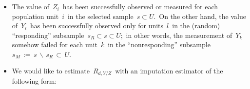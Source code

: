 \begin{itemize}
\begin{equation*}
        \!\!\right)
    \;\; = \;\;\,
        \underset{i \in U}{\sum}\,
        \underset{j \in U}{\sum}\;
        \dfrac{\pi_{ij} - \pi_{i}\pi_{j}}{\pi_{ij}}
        \cdot
        \dfrac{d_{i}\,\xi_{i}}{\pi_{i}}
        \cdot
        \dfrac{d_{j}\,\xi_{j}}{\pi_{j}}\,,
    \end{equation*}
    and the following Horvitz-Thompson variance estimator
    \begin{equation*}
    \widehat{V}^{\textnormal{(HT)}}(\,s\,;\xi_{\bullet}\,)
    \;\; := \;\;
        \underset{i \in s}{\sum}\,
        \underset{j \in s}{\sum}\;
        \dfrac{\pi_{ij} - \pi_{i}\pi_{j}}{\pi_{ij}}
        \cdot
        \dfrac{d_{i}\,\xi_{i}}{\pi_{i}}
        \cdot
        \dfrac{d_{j}\,\xi_{j}}{\pi_{j}}
    \end{equation*}
    is a design-unbiased estimator for the sampling variance of
    \,$\widehat{T}_{d,\xi_{\bullet}} \,=\, \widehat{T}_{d}(s\,;\xi_{\bullet})$,\,
    i.e.,
    \begin{equation*}
    E_{S}\!\left[\;
        \left.
        \widehat{V}^{\textnormal{(HT)}}(\,s\,;\xi_{\bullet}\,)
        \;\right\vert\!
        \begin{array}{c} \xi_{\bullet} \end{array}
        \!\right]
    \;\; = \;\;
        \Var_{S}\!\left(\,
            \left.
            \widehat{T}_{d}(s\,;\xi_{\bullet})
            \;\right\vert\!
            \begin{array}{c} \xi_{\bullet} \end{array}
            \!\!\right)
    \end{equation*}
\item
    The value of \,$Z_{i}$\, has been successfully observed or measured
    for each population unit \,$i$\, in the selected sample \,$s \subset U$.\,
    On the other hand, the value of \,$Y_{l}$\, has been successfully observed
    only for units \,$l$\, in the (random) ``responding'' subsample
    \,$s_{R} \subset s \subset U$;\,
    in other words, the measurement of \,$Y_{k}$\, somehow failed for each unit \,$k$\,
    in the ``nonresponding'' subsample
    \,$s_{M} \, := \,s \,\backslash\, s_{R} \,\subset\, U$.\,
\item
    We would like to estimate \,$R_{d,Y/Z}$\,
    with an imputation estimator of the following form:

\end{itemize}
